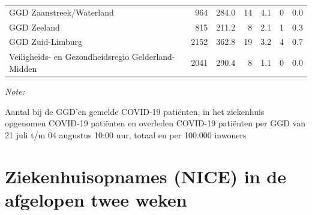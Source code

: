 \documentclass[
  english,
  man,floatsintext]{apa6}
\begin{document}
\begin{table}
\begin{threeparttable}
\begin{tabular}{lrrrrrr}
GGD Zaanstreek/Waterland & 964 & 284.0 & 14 & 4.1 & 0 & 0.0\\
GGD Zeeland & 815 & 211.2 & 8 & 2.1 & 1 & 0.3\\
GGD Zuid-Limburg & 2152 & 362.8 & 19 & 3.2 & 4 & 0.7\\
Veiligheids- en Gezondheidsregio Gelderland-Midden & 2041 & 290.4 & 8 & 1.1 & 0 & 0.0\\
\bottomrule
\end{tabular}
\begin{tablenotes}
\item \textit{Note: } 
\item Aantal bij de GGD’en gemelde COVID-19 patiënten, in het ziekenhuis opgenomen COVID-19 patiënten en overleden COVID-19 patiënten per GGD van 21 juli t/m 04 augustus 10:00 uur, totaal en per 100.000 inwoners
\end{tablenotes}
\end{threeparttable}
\endgroup{}
\end{table}

\newpage

\hypertarget{ziekenhuisopnames-nice-in-de-afgelopen-twee-weken}{%
\section{Ziekenhuisopnames (NICE) in de afgelopen twee weken}\label{ziekenhuisopnames-nice-in-de-afgelopen-twee-weken}}
\end{document}
